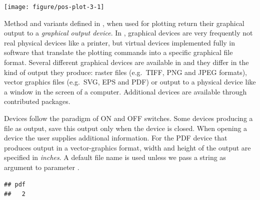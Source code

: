 \documentclass[krantz2]{krantz}\usepackage{knitr}%
\begin{document}
\begin{knitrout}\footnotesize
{}\color{fgcolor}\begin{kframe}
\begin{alltt}
 \hlopt{~}   
\end{alltt}
\end{kframe}

{\centering \texttt{[image: figure/pos-plot-3-1]} 

}



\end{knitrout}

Method  and variants defined in \Rlang, when used for plotting return their graphical output to a \emph{graphical output device}. In \Rlang, graphical devices are very frequently not real physical devices like a printer, but virtual devices implemented fully in software that translate the plotting commands into a specific graphical file format. Several different graphical devices are available in \Rlang and they differ in the kind of output they produce: raster files (e.g.\ TIFF, PNG and JPEG formats), vector graphics files (e.g.\ SVG, EPS and PDF) or output to a physical device like a window in the screen of a computer. Additional devices are available through contributed \Rlang packages.

Devices follow the paradigm of ON and OFF switches. Some devices producing a file as output, save this output only when the device is closed. When opening a device the user supplies additional information. For the PDF device that produces output in a vector-graphics format, width and height of the output are specified in \emph{inches}. A default file name is used unless we pass a  string as argument to parameter .

\begin{knitrout}\footnotesize
{}\color{fgcolor}\begin{kframe}
\begin{alltt}
\hlstd{(} \hlstd{=} \hlstd{,}  \hlstd{=} \hlstd{,}  \hlstd{=} \hlstd{,}  \hlstd{=} \hlstd{)}
 \hlopt{~}   
 \hlopt{~}   
\hlstd{()}
\end{alltt}
\begin{verbatim}
## pdf 
##   2
\end{verbatim}
\end{kframe}
\end{knitrout}
\end{document}
